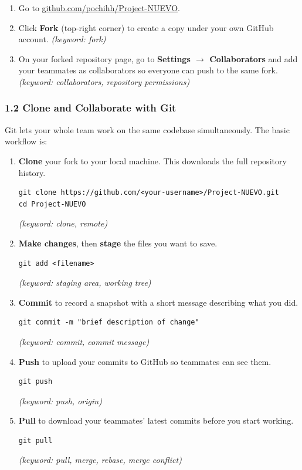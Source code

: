\documentclass{ol-softwaremanual}
\newcommand{\doclink}[2]{\href{#1}{#2}}
\begin{document}
\begin{enumerate}
  \item Go to \doclink{https://github.com/pochihh/Project-NUEVO}{github.com/pochihh/Project-NUEVO}.
  \item Click \textbf{Fork} (top-right corner) to create a copy under your own GitHub account.
    \hfill\textit{(keyword: fork)}
  \item On your forked repository page, go to \textbf{Settings $\to$ Collaborators}
        and add your teammates as collaborators so everyone can push to the same fork.
    \hfill\textit{(keyword: collaborators, repository permissions)}
\end{enumerate}

\subsubsection*{1.2 Clone and Collaborate with Git}

Git lets your whole team work on the same codebase simultaneously.
The basic workflow is:

\begin{enumerate}
  \item \textbf{Clone} your fork to your local machine.
        This downloads the full repository history.
\begin{verbatim}
git clone https://github.com/<your-username>/Project-NUEVO.git
cd Project-NUEVO
\end{verbatim}
        \hfill\textit{(keyword: clone, remote)}

  \item \textbf{Make changes}, then \textbf{stage} the files you want to save.
\begin{verbatim}
git add <filename>
\end{verbatim}
        \hfill\textit{(keyword: staging area, working tree)}

  \item \textbf{Commit} to record a snapshot with a short message describing what you did.
\begin{verbatim}
git commit -m "brief description of change"
\end{verbatim}
        \hfill\textit{(keyword: commit, commit message)}

  \item \textbf{Push} to upload your commits to GitHub so teammates can see them.
\begin{verbatim}
git push
\end{verbatim}
        \hfill\textit{(keyword: push, origin)}

  \item \textbf{Pull} to download your teammates' latest commits before you start working.
\begin{verbatim}
git pull
\end{verbatim}
        \hfill\textit{(keyword: pull, merge, rebase, merge conflict)}
\end{enumerate}
\end{document}
